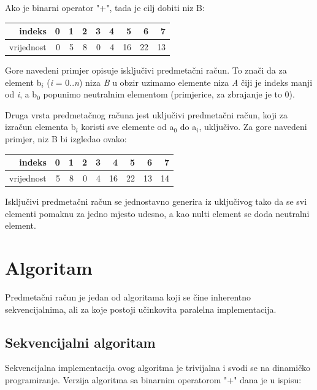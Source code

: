 \documentclass[times, utf8, zavrsni]{fer}
\begin{document}
Ako je binarni operator "+", tada je cilj dobiti niz B:
\begin{center}
\begin{tabular}{| r | r | r | r | r | r | r | r | r |}
\hline
indeks & 0 & 1 & 2 & 3 & 4 & 5 & 6 & 7 \\
\hline
vrijednost & 0 & 5 & 8 & 0 & 4 & 16 & 22 & 13\\
\hline
\end{tabular}
\end{center}

Gore navedeni primjer opisuje isključivi predmetačni račun. To znači da za element b$_{i}$ (\textit{i} = 0..\textit{n}) niza \textit{B} u obzir uzimamo elemente niza \textit{A} čiji je indeks manji od \textit{i}, a b$_{0}$ popunimo neutralnim elementom (primjerice, za zbrajanje je to 0).

Druga vrsta predmetačnog računa jest uključivi predmetačni račun, koji za izračun elementa b$_{i}$ koristi sve elemente od a$_{0}$ do a$_{i}$, uključivo. Za gore navedeni primjer, niz B bi izgledao ovako:
\begin{center}
\begin{tabular}{| r | r | r | r | r | r | r | r | r |}
\hline
indeks & 0 & 1 & 2 & 3 & 4 & 5 & 6 & 7\\
\hline
vrijednost & 5 & 8 & 0 & 4 & 16 & 22 & 13 & 14\\
\hline
\end{tabular}
\end{center}

Isključivi predmetačni račun se jednostavno generira iz uključivog tako da se svi elementi pomaknu za jedno mjesto udesno, a kao nulti element se doda neutralni element.


\section{Algoritam}

\indent

Predmetačni račun je jedan od algoritama koji se čine inherentno sekvencijalnima, ali za koje postoji učinkovita paralelna implementacija.

\subsection{Sekvencijalni algoritam}

\indent

Sekvencijalna implementacija ovog algoritma je trivijalna i svodi se na dinamičko programiranje. Verzija algoritma sa binarnim operatorom "+" dana je u ispisu:
\end{document}
